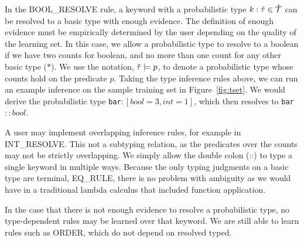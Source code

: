 In the {\scriptsize BOOL\_RESOLVE} rule, a keyword with a probabilistic type $k : \tilde{\tau} \in \tilde{\mathcal{T}}$ can be resolved to a basic type with enough evidence.
The definition of enough evidence must be empirically determined by the user depending on the quality of the learning set.
In this case, we allow a probabilistic type to resolve to a boolean if we have two counts for boolean, and no more than one count for any other basic type ($\ast$).
We use the notation, $\tilde{\tau} \models p$, to denote a probabilistic type whose counts hold on the predicate $p$.
Taking the type inference rules above, we can run an example inference on the sample training set in Figure~\ref{fig:tset}.
We would derive the probabilistic type \texttt{bar}$:[bool=3,int=1]$, which then resolves to \texttt{bar}$::bool$.
 
A user may implement overlapping inference rules, for example in {\scriptsize INT\_RESOLVE}.
This not a subtyping relation, as the predicates over the counts may not be strictly overlapping.
We simply allow the double colon (::) to type a single keyword in multiple ways.
Because the only typing judgments on a basic type are terminal, {\scriptsize EQ\_RULE}, there is no problem with ambiguity as we would have in a traditional lambda calculus that included function application.


In the case that there is not enough evidence to resolve a probabilistic type, no type-dependent rules may be learned over that keyword.
We are still able to learn rules such as {\scriptsize ORDER}, which do not depend on resolved typed. 


